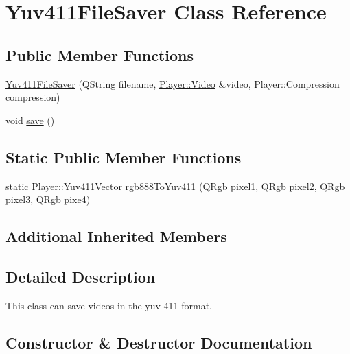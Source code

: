 \hypertarget{classPlayer_1_1Yuv411FileSaver}{}\section{Yuv411\+File\+Saver Class Reference}
\label{classPlayer_1_1Yuv411FileSaver}
\subsection*{Public Member Functions}
\begin{DoxyCompactItemize}
\item 
\hyperlink{classPlayer_1_1Yuv411FileSaver_a392a8f96307045da02259ccd1716322f}{Yuv411\+File\+Saver} (Q\+String filename, \hyperlink{classPlayer_1_1Video}{Player\+::\+Video} \&video, Player\+::\+Compression compression)
\item 
void \hyperlink{classPlayer_1_1Yuv411FileSaver_aae2c382151ef7c9aa913361172b30db6}{save} ()
\end{DoxyCompactItemize}
\subsection*{Static Public Member Functions}
\begin{DoxyCompactItemize}
\item 
static \hyperlink{classPlayer_1_1Yuv411Vector}{Player\+::\+Yuv411\+Vector} \hyperlink{classPlayer_1_1Yuv411FileSaver_a3c110e0ea9366dffdddbb2484a35bb52}{rgb888\+To\+Yuv411} (Q\+Rgb pixel1, Q\+Rgb pixel2, Q\+Rgb pixel3, Q\+Rgb pixe4)
\end{DoxyCompactItemize}
\subsection*{Additional Inherited Members}


\subsection{Detailed Description}
This class can save videos in the yuv 411 format. 

\subsection{Constructor \& Destructor Documentation}
\hypertarget{classPlayer_1_1Yuv411FileSaver_a392a8f96307045da02259ccd1716322f}{}

